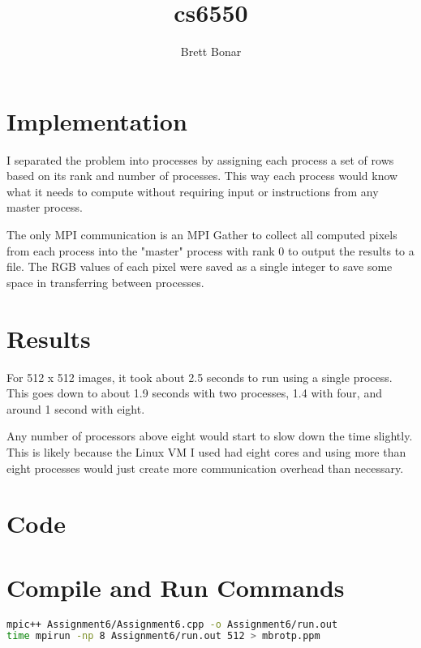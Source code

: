 \documentclass{article}
\title{cs6550}
\author{ Brett Bonar }
\begin{document}
\maketitle

\section{Implementation}
I separated the problem into processes by assigning each process a set of rows based on its rank and number of processes. This way each process would know what it needs to compute without requiring input or instructions from any master process.

The only MPI communication is an MPI Gather to collect all computed pixels from each process into the "master" process with rank 0 to output the results to a file. The RGB values of each pixel were saved as a single integer to save some space in transferring between processes.

\section{Results}
For 512 x 512 images, it took about 2.5 seconds to run using a single process. This goes down to about 1.9 seconds with two processes, 1.4 with four, and around 1 second with eight.

Any number of processors above eight would start to slow down the time slightly. This is likely because the Linux VM I used had eight cores and using more than eight processes would just create more communication overhead than necessary.

\section{Code}



\section{Compile and Run Commands}
\begin{lstlisting}[language=bash]
mpic++ Assignment6/Assignment6.cpp -o Assignment6/run.out
time mpirun -np 8 Assignment6/run.out 512 > mbrotp.ppm
\end{lstlisting}
\end{document}
